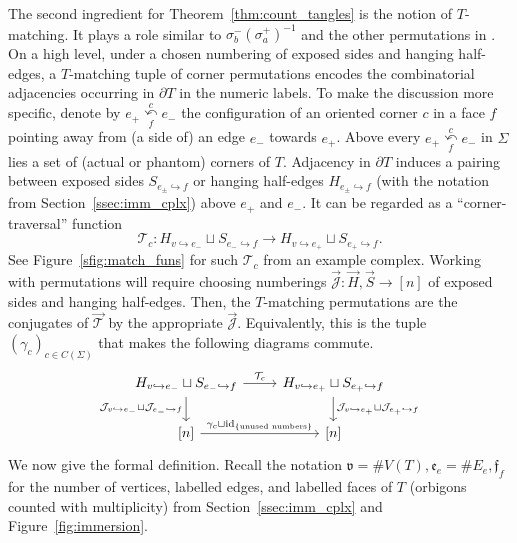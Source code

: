 \documentclass{amsart}
\newcommand{\corner}[1][]{
 \underset{f#1}
 {
  \overset{c#1}{\curvearrowleft}
 }
}
\newcommand{\tn}{\textnormal}
\begin{document}
The second ingredient for Theorem~\ref{thm:count_tangles} is the notion of $T$-matching. It plays a role similar to $\sigma_b^-(\sigma_a^+)^{-1}$ and the other permutations in \cite[Lemma 5.2.P4 in \S5.3]{asymptotic_stats_random_covering_surfaces_MageePuder23}. On a high level, under a chosen numbering of exposed sides and hanging half-edges, a $T$-matching tuple of corner permutations encodes the combinatorial adjacencies occurring in $\partial T$ in the numeric labels. To make the discussion more specific, denote by $e_+\corner e_-$ the configuration of an oriented corner $c$ in a face $f$ pointing away from (a side of) an edge $e_-$ towards $e_+$. Above every $e_+\corner e_-$ in $\Sigma$ lies a set of (actual or phantom) corners of $T$. Adjacency in $\partial T$ induces a pairing between exposed sides $S_{e_\pm\hookrightarrow f}$ or hanging half-edges $H_{e_\pm\hookrightarrow f}$ (with the notation from Section~\ref{ssec:imm_cplx}) above $e_+$ and $e_-$. It can be regarded as a ``corner-traversal'' function
\begin{equation}\label{eq:corner_traverse}
\mathcal{T}_c\colon H_{v\hookrightarrow e_-}\sqcup S_{e_-\hookrightarrow f}\to H_{v\hookrightarrow e_+}\sqcup S_{e_+\hookrightarrow f}.
\end{equation}
See Figure~\ref{sfig:match_funs} for such $\mathcal{T}_c$ from an example complex. Working with permutations will require choosing numberings $\vec{\mathcal{J}}\colon \vec{H},\vec{S}\to[n]$ of exposed sides and hanging half-edges. Then, the $T$-matching permutations are the conjugates of $\vec{\mathcal{T}}$ by the appropriate $\vec{\mathcal{J}}$. Equivalently, this is the tuple $(\gamma_c)_{c\in C(\Sigma)}$ that makes the following diagrams commute.
\begin{equation*}\begin{tikzcd}
H_{v\hookrightarrow e_-}\sqcup S_{e_-\hookrightarrow f}\arrow[r,"\mathcal{T}_c"]\arrow[d,"\mathcal{J}_{v\hookrightarrow e_-}\sqcup\mathcal{J}_{e_-\hookrightarrow f}"']&H_{v\hookrightarrow e_+}\sqcup S_{e_+\hookrightarrow f}\arrow[d,"\mathcal{J}_{v\hookrightarrow e_+}\sqcup\mathcal{J}_{e_+\hookrightarrow f}"]\\
{[n]}\arrow[r,"\gamma_c\sqcup\tn{id}_{\{\text{unused numbers}\}}"]&{[n]}
\end{tikzcd}\end{equation*}
We now give the formal definition. Recall the notation $\mathfrak{v}=\#V(T),\mathfrak{e}_e=\#E_e,\mathfrak{f}_f$ for the number of vertices, labelled edges, and labelled faces of $T$ (orbigons counted with multiplicity) from Section~\ref{ssec:imm_cplx} and Figure~\ref{fig:immersion}.
\end{document}
